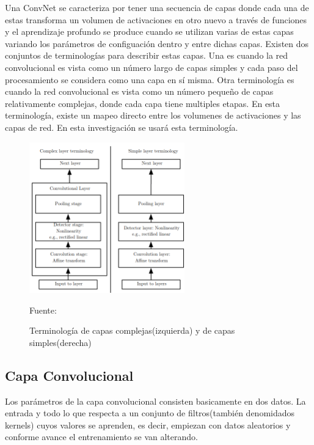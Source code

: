 	Una ConvNet se caracteriza por tener una secuencia de capas donde cada una de estas transforma un volumen de activaciones en otro nuevo a través de funciones y el aprendizaje profundo se produce cuando se utilizan varias de estas capas variando los parámetros de configuación dentro y entre dichas capas. 
	\vskip 0.4cm  
	Existen dos conjuntos de terminologías para describir estas capas. Una es cuando la red convolucional es vista como un número largo de capas simples y cada paso del procesamiento se considera como una capa en sí misma. Otra terminología es cuando la red convolucional es vista como un número pequeño de capas relativamente complejas, donde cada capa tiene multiples etapas. En esta terminología, existe un mapeo directo entre los volumenes de activaciones y las capas de red. En esta investigación se usará esta terminología.

	
	\begin{figure}[H]
	\begin{center}
	\includegraphics[width=0.6\textwidth]{images/marcoteorico/types}
	\end{center}
	\begin{center}
	\caption{\small{Terminología de capas complejas(izquierda) y de capas simples(derecha)}}
	{\small{Fuente: \cite{Goodfellow-et-al-2016}}}
	\end{center}
	\vspace{-1.5em}
	\end{figure}
	
	\subsection{Capa Convolucional}

		Los parámetros de la capa convolucional consisten basicamente en dos datos. La entrada y todo lo que respecta a un conjunto de filtros(también denomidados kernels) cuyos valores se aprenden, es decir, empiezan con datos aleatorios y conforme avance el entrenamiento se van alterando. 
		\vskip 0.3cm 
